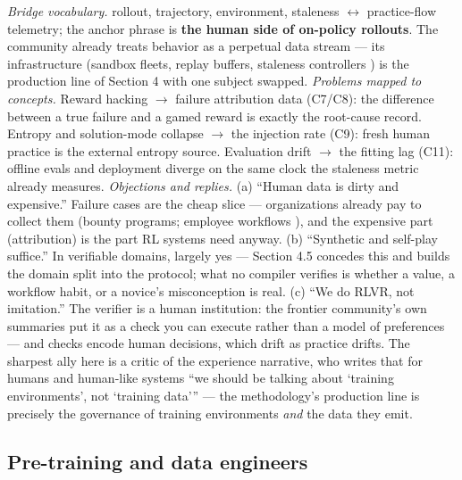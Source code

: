 \documentclass[10pt]{article}
\begin{document}
\emph{Bridge vocabulary.} rollout, trajectory, environment, staleness $\leftrightarrow$ practice-flow telemetry; the anchor phrase is \textbf{the human side of on-policy rollouts}. The community already treats behavior as a perpetual data stream --- its infrastructure (sandbox fleets, replay buffers, staleness controllers \cite{ref48,ref49}) is the production line of Section 4 with one subject swapped. \emph{Problems mapped to concepts.} Reward hacking $\to$ failure attribution data (C7/C8): the difference between a true failure and a gamed reward is exactly the root-cause record. Entropy and solution-mode collapse \cite{ref11} $\to$ the injection rate (C9): fresh human practice is the external entropy source. Evaluation drift $\to$ the fitting lag (C11): offline evals and deployment diverge on the same clock the staleness metric already measures. \emph{Objections and replies.} (a) ``Human data is dirty and expensive.'' Failure cases are the cheap slice --- organizations already pay to collect them (bounty programs; employee workflows \cite{ref20}), and the expensive part (attribution) is the part RL systems need anyway. (b) ``Synthetic and self-play suffice.'' In verifiable domains, largely yes --- Section 4.5 concedes this and builds the domain split into the protocol; what no compiler verifies is whether a value, a workflow habit, or a novice's misconception is real. (c) ``We do RLVR, not imitation.'' The verifier is a human institution: the frontier community's own summaries put it as a check you can execute rather than a model of preferences \cite{ref66} --- and checks encode human decisions, which drift as practice drifts. The sharpest ally here is a critic of the experience narrative, who writes that for humans and human-like systems ``we should be talking about `training environments', not `training data''' \cite{ref67} --- the methodology's production line is precisely the governance of training environments \emph{and} the data they emit.

\subsection{Pre-training and data engineers}
\end{document}
